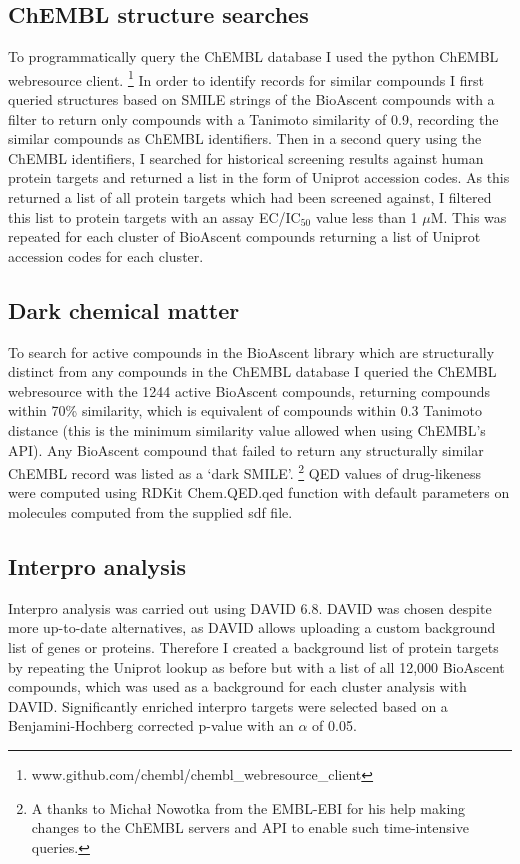 \documentclass[a4paper,11pt,twoside,openright]{scrbook}
\begin{document}
\subsection{ChEMBL structure searches}
To programmatically query the ChEMBL database I used the python ChEMBL webresource client. 
\footnote{www.github.com/chembl/chembl\_webresource\_client}
In order to identify records for similar compounds I first queried structures based on SMILE strings of the BioAscent 
compounds with a filter to return only compounds with a Tanimoto similarity of 0.9, recording the similar compounds as 
ChEMBL identifiers.
Then in a second query using the ChEMBL identifiers, I searched for historical screening results against human protein 
targets and returned a list in the form of Uniprot accession codes.
As this returned a list of all protein targets which had been screened against, I filtered this list to protein targets 
with an assay EC/IC$_{50}$ value less than 1 $\mu$M.
This was repeated for each cluster of BioAscent compounds returning a list of Uniprot accession codes for each cluster.


\subsection{Dark chemical matter}
To search for active compounds in the BioAscent library which are structurally distinct from any compounds in the 
ChEMBL database I queried the ChEMBL webresource with the 1244 active BioAscent compounds, returning compounds within 
70\% similarity, which is equivalent of compounds within 0.3 Tanimoto distance (this is the minimum similarity value 
allowed when using ChEMBL's API).
Any BioAscent compound that failed to return any structurally similar ChEMBL record was listed as a `dark SMILE'.
\footnote{A thanks to Michał Nowotka from the EMBL-EBI for his help making changes to the ChEMBL servers and API to 
enable such time-intensive queries.}
QED values of drug-likeness were computed using RDKit Chem.QED.qed function with default parameters on molecules 
computed from the supplied sdf file.


\subsection{Interpro analysis}
Interpro analysis was carried out using DAVID 6.8. \cite{Huang2009}
DAVID was chosen despite more up-to-date alternatives, as DAVID allows uploading a custom background list of genes or 
proteins.
Therefore I created a background list of protein targets by repeating the Uniprot lookup as before but with a list of 
all 12,000 BioAscent compounds, which was used as a background for each cluster analysis with DAVID.
Significantly enriched interpro targets were selected based on a Benjamini-Hochberg corrected p-value with an $\alpha$ 
of 0.05.
\end{document}
